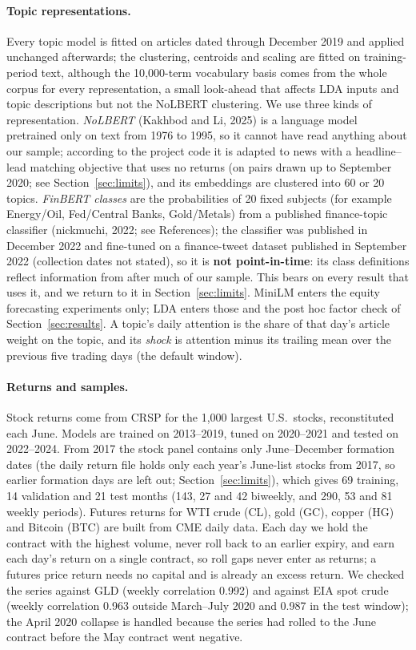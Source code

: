 \documentclass[11pt]{article}
\begin{document}
\paragraph{Topic representations.} Every topic model is fitted on articles dated through December 2019 and applied unchanged afterwards; the clustering, centroids and scaling are fitted on training-period text, although the 10{,}000-term vocabulary basis comes from the whole corpus for every representation, a small look-ahead that affects LDA inputs and topic descriptions but not the NoLBERT clustering. We use three kinds of representation. \emph{NoLBERT} (Kakhbod and Li, 2025) is a language model pretrained only on text from 1976 to 1995, so it cannot have read anything about our sample; according to the project code it is adapted to news with a headline--lead matching objective that uses no returns (on pairs drawn up to September 2020; see Section~\ref{sec:limits}), and its embeddings are clustered into 60 or 20 topics. \emph{FinBERT classes} are the probabilities of 20 fixed subjects (for example Energy/Oil, Fed/Central Banks, Gold/Metals) from a published finance-topic classifier (nickmuchi, 2022; see References); the classifier was published in December 2022 and fine-tuned on a finance-tweet dataset published in September 2022 (collection dates not stated), so it is \textbf{not point-in-time}: its class definitions reflect information from after much of our sample. This bears on every result that uses it, and we return to it in Section~\ref{sec:limits}. MiniLM enters the equity forecasting experiments only; LDA enters those and the post hoc factor check of Section~\ref{sec:results}. A topic's daily attention is the share of that day's article weight on the topic, and its \emph{shock} is attention minus its trailing mean over the previous five trading days (the default window).

\paragraph{Returns and samples.} Stock returns come from CRSP for the 1{,}000 largest U.S.\ stocks, reconstituted each June. Models are trained on 2013--2019, tuned on 2020--2021 and tested on 2022--2024. From 2017 the stock panel contains only June--December formation dates (the daily return file holds only each year's June-list stocks from 2017, so earlier formation days are left out; Section~\ref{sec:limits}), which gives 69 training, 14 validation and 21 test months (143, 27 and 42 biweekly, and 290, 53 and 81 weekly periods). Futures returns for WTI crude (CL), gold (GC), copper (HG) and Bitcoin (BTC) are built from CME daily data. Each day we hold the contract with the highest volume, never roll back to an earlier expiry, and earn each day's return on a single contract, so roll gaps never enter as returns; a futures price return needs no capital and is already an excess return. We checked the series against GLD (weekly correlation 0.992) and against EIA spot crude (weekly correlation 0.963 outside March--July 2020 and 0.987 in the test window); the April 2020 collapse is handled because the series had rolled to the June contract before the May contract went negative.
\end{document}

